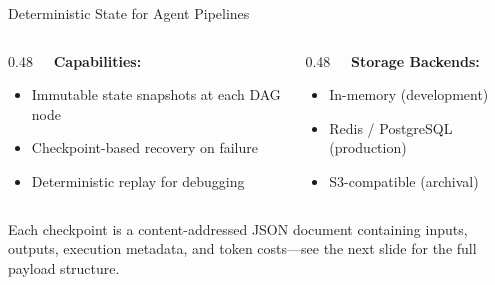 \begin{frame}{Deterministic State for Agent Pipelines}
  \fontsize{6}{7}\selectfont
  \begin{columns}[T]
    \begin{column}{0.48\textwidth}
      \textbf{\ \ Capabilities:}
      \begin{itemize}
        \item Immutable state snapshots at each DAG node
        \item Checkpoint-based recovery on failure
        \item Deterministic replay for debugging
      \end{itemize}
    \end{column}
    \begin{column}{0.48\textwidth}
      \textbf{\faPlug\ \ Storage Backends:}
      \begin{itemize}
        \item In-memory (development)
        \item Redis / PostgreSQL (production)
        \item S3-compatible (archival)
      \end{itemize}
    \end{column}
  \end{columns}

  \vspace{-0.1cm}

  \begin{exampleblock}{}
    \fontsize{6}{7}\selectfont
    Each checkpoint is a content-addressed JSON document containing inputs, outputs,
    execution metadata, and token costs---see the next slide for the full payload structure.
  \end{exampleblock}
\end{frame}
